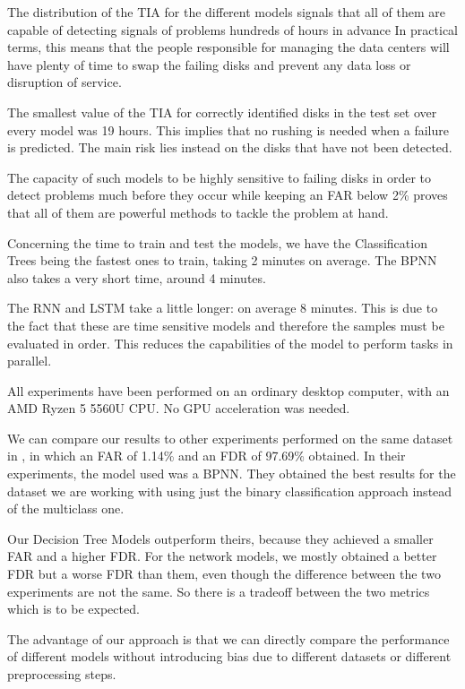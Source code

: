 The distribution of the TIA for the different models signals that all of them are capable of detecting signals of problems hundreds of hours in advance
In practical terms, this means that the people responsible for managing the data centers will have plenty of time to swap the failing disks and prevent any data loss or disruption of service.

The smallest value of the TIA for correctly identified disks in the test set over every model was 19 hours.
This implies that no rushing is needed when a failure is predicted.
The main risk lies instead on the disks that have not been detected.

The capacity of such models to be highly sensitive to failing disks in order to detect problems much before they occur while keeping an FAR below 2\% proves that all of them are powerful methods to tackle the problem at hand.

Concerning the time to train and test the models, we have the Classification Trees being the fastest ones to train, taking 2 minutes on average.
The BPNN also takes a very short time, around 4 minutes.

The RNN and LSTM take a little longer: on average 8 minutes.
This is due to the fact that these are time sensitive models and therefore the samples must be evaluated in order.
This reduces the capabilities of the model to perform tasks in parallel.

All experiments have been performed on an ordinary desktop computer, with an AMD Ryzen 5 5560U CPU.
No GPU acceleration was needed.

We can compare our results to other experiments performed on the same dataset in \cite{Zhu13}, in which an FAR of 1.14\% and an FDR of 97.69\% obtained.
In their experiments, the model used was a BPNN.
They obtained the best results for the dataset we are working with using just the binary classification approach instead of the multiclass one. 

Our Decision Tree Models outperform theirs, because they achieved a smaller FAR and a higher FDR.
For the network models, we mostly obtained a better FDR but a worse FDR than them, even though the difference between the two experiments are not the same.
So there is a tradeoff between the two metrics which is to be expected.

The advantage of our approach is that we can directly compare the performance of different models without introducing bias due to different datasets or different preprocessing steps.

